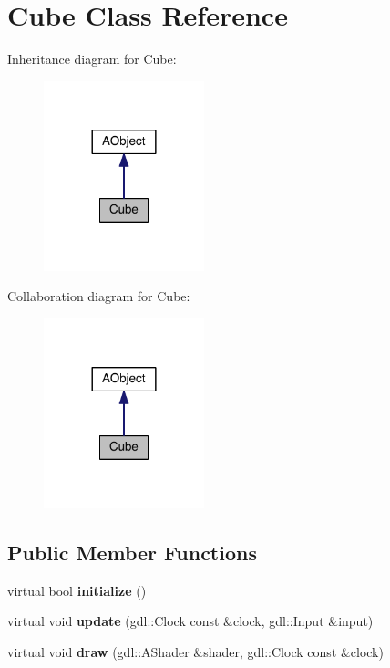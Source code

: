 \hypertarget{class_cube}{}\section{Cube Class Reference}
\label{class_cube}


Inheritance diagram for Cube\+:\nopagebreak
\begin{figure}[H]
\begin{center}
\leavevmode
\includegraphics[width=132pt]{class_cube__inherit__graph}
\end{center}
\end{figure}


Collaboration diagram for Cube\+:\nopagebreak
\begin{figure}[H]
\begin{center}
\leavevmode
\includegraphics[width=132pt]{class_cube__coll__graph}
\end{center}
\end{figure}
\subsection*{Public Member Functions}
\begin{DoxyCompactItemize}
\item 
\hypertarget{class_cube_abe087c788eb9eeb0c27a834ae2c11cf8}{}virtual bool {\bfseries initialize} ()\label{class_cube_abe087c788eb9eeb0c27a834ae2c11cf8}

\item 
\hypertarget{class_cube_aa917cc6d252c727fe83e01e40b2f7e64}{}virtual void {\bfseries update} (gdl\+::\+Clock const \&clock, gdl\+::\+Input \&input)\label{class_cube_aa917cc6d252c727fe83e01e40b2f7e64}

\item 
\hypertarget{class_cube_ac481386d97483b5db3290e2462372486}{}virtual void {\bfseries draw} (gdl\+::\+A\+Shader \&shader, gdl\+::\+Clock const \&clock)\label{class_cube_ac481386d97483b5db3290e2462372486}

\end{DoxyCompactItemize}
